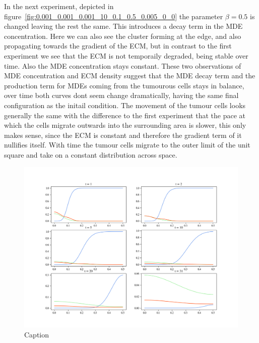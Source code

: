 In the next experiment, depicted in figure~\ref{fig:0.001_0.001_0.001_10_0.1_0.5_0.005_0_0} the parameter $\beta = 0.5$ is changed leaving the rest the same. This introduces a decay term in the MDE concentration. Here we can also see the cluster forming at the edge, and also propagating towards the gradient of the ECM, but in contrast to the first experiment we see that the ECM is not temporaily degraded, being stable over time. Also the MDE concentration stays constant. These two observations of MDE concentration and ECM density suggest that the MDE decay term and the production term for MDEs coming from the tumourous cells stays in balance, over time both curves dont seem change dramatically, having the same final configuration as the initail condition. The movement of the tumour cells looks generally the same with the difference to the first experiment that the pace at which the cells migrate outwards into the surrounding area is slower, this only makes sense, since the ECM is constant and therefore the gradient term of it nullifies itself. With time the tumour cells migrate to the outer limit of the unit square and take on a constant distribution across space. 
\begin{figure}
    \centering
    \includegraphics[width=\textwidth]{resources/images/0.001_0.001_0.001_20_0.1_0_0.002_0_0.png}
    \caption{Caption}
    \label{fig:0.001_0.001_0.001_20_0.1_0_0.002_0_0}
\end{figure}
